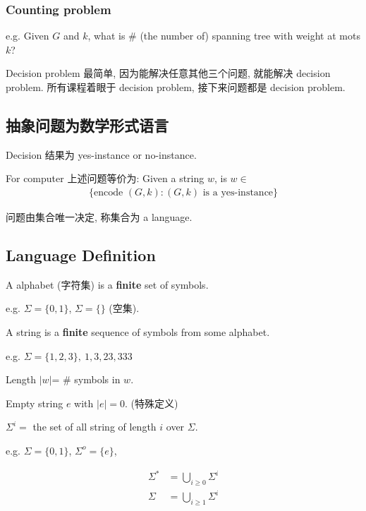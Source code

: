 \subsubsection{Counting problem}
e.g. Given $G$ and $k$, what is \# (the number of) spanning tree with weight at mots $k$?

Decision problem 最简单, 因为能解决任意其他三个问题, 就能解决 decision problem. 所有课程着眼于 decision problem, 接下来问题都是 decision problem. 

\subsection{抽象问题为数学形式语言}
Decision 结果为 yes-instance or no-instance. 

For computer 上述问题等价为: Given a string $w$, is $w \in $
\begin{align*}
    \{ \text{encode } (G, k): (G, k) \text{ is a yes-instance} \}
\end{align*}

问题由集合唯一决定, 称集合为 a language. 

\subsection{Language Definition}

\begin{definition}[Alphabet]
    A alphabet (字符集) is a \textbf{finite} set of symbols. 
\end{definition}

e.g. $\Sigma = \{0,1\}$, $\Sigma=\{  \}$ (空集). 


\begin{definition}[String]
    A string is a \textbf{finite} sequence of symbols from some alphabet. 
\end{definition}

e.g. $\Sigma=\{ 1,2,3 \},\ 1,3,23, 333$

Length $|w|$= \# symbols in $w$. 

Empty string $e$ with $|e|=0$. (特殊定义)

$\Sigma^i=$ the set of all string of length $i$ over $\Sigma$. 

e.g. $\Sigma=\{ 0, 1 \}$, $\Sigma^o=\{ e \}$, 

\begin{align*}
    \Sigma^*&={\bigcup }_{i\ge 0}\Sigma^i\\
    \Sigma &= {\bigcup }_{i\ge 1} \Sigma^i
\end{align*}

